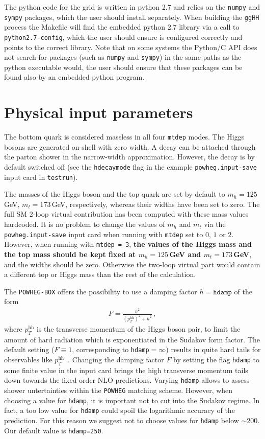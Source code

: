 \documentclass[paper]{JHEP3}
\newcommand\POWHEG{{\tt POWHEG}}
\newcommand\POWHEGBOX{{\tt POWHEG-BOX}}
\newcommand\pthh{\ensuremath{p_{T}^{\mathrm{hh}}}\xspace}
\begin{document}
The python code for the grid is written in python 2.7 and relies on the {\tt numpy} and {\tt sympy} packages, which 
the user should install separately. When building the {\tt ggHH} process the Makefile will find the embedded python 2.7 library
via a call to {\tt python2.7-config}, which the user should ensure is configured correctly and points to the correct library.
Note that on some systems the Python/C API does not search for packages (such as {\tt numpy} and {\tt sympy}) in the same 
paths as the python executable would, the user should ensure that these packages can be found also by an embedded python program.

\section{Physical input parameters}

The bottom quark is considered massless in all four {\tt mtdep} modes. The Higgs
bosons are generated on-shell with zero width. A decay can be attached
through the parton shower in the narrow-width approximation. However,
the decay is by default switched off (see the {\tt hdecaymode} flag in the
example {\tt powheg.input-save} input card in {\tt testrun}).

The masses of the Higgs boson and the top quark are set by default to
$m_h=125$\,GeV, $m_t=173$\,GeV, respectively, whereas their widths
have been set to zero. The full SM 2-loop virtual contribution has
been computed with these mass values hardcoded. 
It is no problem to change the values of $m_h$
and $m_t$ via the {\tt powheg.input-save} input card when running with
{\tt mtdep} set to $0$, $1$ or $2$.
However, when running with {\tt mtdep = 3}, 
 {\bf the values of the Higgs mass and
the top mass should be kept fixed at $m_h=125$\,GeV and $m_t=173$\,GeV}, and the widths should be zero.
Otherwise the two-loop virtual part would contain a different top or Higgs mass than the rest of the calculation.

The \POWHEGBOX{} offers the possibility to use a damping factor $h=\texttt{hdamp}$ of the
form~\cite{Alioli:2008tz,Alioli:2009je}
\begin{align}
  F=\frac{h^{2}}{(\pthh)^2+h^{2}}\,,
\end{align}
where \pthh is the transverse momentum of the Higgs boson pair, to
limit the amount of hard radiation which is exponentiated in the
Sudakov form factor. The default setting ($F\equiv1$, corresponding to {\tt hdamp}$=\infty$) results in
quite hard tails for observables like
$\pthh$~\cite{Heinrich:2017kxx}. Changing the damping factor $F$ by
setting the flag {\tt hdamp} to some finite value in the input
card brings the high transverse momentum tails down towards the fixed-order NLO
predictions. Varying {\tt hdamp} allows to assess shower untertainties
within the \POWHEG{} matching scheme. However, when choosing a value
for {\tt hdamp}, it is important not to cut into the Sudakov
regime. In fact, a too low value for {\tt hdamp} could spoil the
logarithmic accuracy of the prediction. For this reason we suggest not
to choose values for {\tt hdamp} below $\sim 200$. Our default value is  {\tt hdamp=250}.
\end{document}
